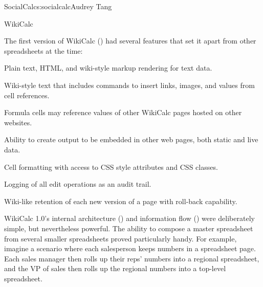 \begin{aosachapter}{SocialCalc}{s:socialcalc}{Audrey Tang}
\begin{aosasect1}{WikiCalc}

The first version of WikiCalc () had
several features that set it apart from other spreadsheets at the
time:

\begin{aosaitemize}

  \item Plain text, HTML, and wiki-style markup rendering for text data.

  \item Wiki-style text that includes commands to insert links, images,
  and values from cell references.

  \item Formula cells may reference values of other WikiCalc pages
  hosted on other websites.

  \item Ability to create output to be embedded in other web pages, both
  static and live data.

  \item Cell formatting with access to CSS style attributes and CSS
  classes.

  \item Logging of all edit operations as an audit trail.

  \item Wiki-like retention of each new version of a page with roll-back
  capability.

\end{aosaitemize}




WikiCalc 1.0's internal architecture () and
information flow () were deliberately simple,
but nevertheless powerful.  The ability to compose a master
spreadsheet from several smaller spreadsheets proved particularly
handy.  For example, imagine a scenario where each salesperson keeps
numbers in a spreadsheet page.  Each sales manager then rolls up their
reps' numbers into a regional spreadsheet, and the VP of sales then
rolls up the regional numbers into a top-level spreadsheet.


\end{aosasect1}
\end{aosachapter}
